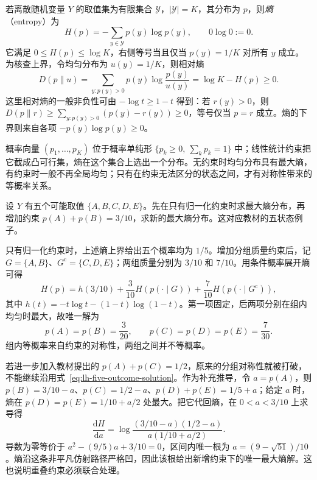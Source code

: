 若离散随机变量 $Y$ 的取值集为有限集合 $\mathcal Y$，$|\mathcal Y|=K$，其分布为 $p$，则\emph{熵}（entropy）为
\begin{equation}
H(p)=-\sum_{y\in\mathcal Y}p(y)\log p(y),\qquad 0\log0:=0.
\label{eq:lh-entropy}
\end{equation}
它满足 $0\leq H(p)\leq\log K$，右侧等号当且仅当 $p(y)=1/K$ 对所有 $y$ 成立。为核查上界，令均匀分布为 $u(y)=1/K$，则相对熵
\[
D(p\|u)=\sum_{y:p(y)>0}p(y)\log\frac{p(y)}{u(y)}
=\log K-H(p)\geq0.
\]
这里相对熵的一般非负性可由 $-\log t\geq1-t$ 得到：若 $r(y)>0$，则 $D(p\|r)\geq\sum_{y:p(y)>0}(p(y)-r(y))\geq0$，等号仅当 $p=r$ 成立。熵的下界则来自各项 $-p(y)\log p(y)\geq0$。

概率向量 $(p_1,\ldots,p_K)$ 位于概率单纯形 $\{p_k\geq0,\ \sum_kp_k=1\}$ 中；线性统计约束把它截成凸可行集，熵在这个集合上选出一个分布。无约束时均匀分布具有最大熵，有约束时一般不再全局均匀；只有在约束无法区分的状态之间，才有对称性带来的等概率关系。

\begin{example}
\label{ex:lh-five-outcomes}
设 $Y$ 有五个可能取值 $\{A,B,C,D,E\}$。先在只有归一化约束时求最大熵分布，再增加约束 $p(A)+p(B)=3/10$，求新的最大熵分布。这对应教材的五状态例子。
\end{example}
\begin{solve}
只有归一化约束时，上述熵上界给出五个概率均为 $1/5$。增加分组质量约束后，记 $G=\{A,B\}$、$G^{\mathrm c}=\{C,D,E\}$；两组质量分别为 $3/10$ 和 $7/10$。用条件概率展开熵可得
\[
H(p)=h(3/10)+\frac3{10}H(p(\cdot\mid G))
+\frac7{10}H(p(\cdot\mid G^{\mathrm c})),
\]
其中 $h(t)=-t\log t-(1-t)\log(1-t)$。第一项固定，后两项分别在组内均匀时最大，故唯一解为
\begin{equation}
p(A)=p(B)=\frac3{20},\qquad
p(C)=p(D)=p(E)=\frac7{30}.
\label{eq:lh-five-outcome-solution}
\end{equation}
组内等概率来自约束的对称性，两组之间并不等概率。
\end{solve}

若进一步加入教材提出的 $p(A)+p(C)=1/2$，原来的分组对称性就被打破，不能继续沿用式~\eqref{eq:lh-five-outcome-solution}。作为补充推导，令 $a=p(A)$，则 $p(B)=3/10-a$、$p(C)=1/2-a$、$p(D)+p(E)=1/5+a$；给定 $a$ 时，熵在 $p(D)=p(E)=1/10+a/2$ 处最大。把它代回熵，在 $0<a<3/10$ 上求导得
\[
\frac{\mathrm dH}{\mathrm da}
=\log\frac{(3/10-a)(1/2-a)}{a(1/10+a/2)}.
\]
导数为零等价于 $a^2-(9/5)a+3/10=0$，区间内唯一根为 $a=(9-\sqrt{51})/10$。熵沿这条非平凡仿射路径严格凹，因此该根给出新增约束下的唯一最大熵解。这也说明重叠约束必须联合处理。


